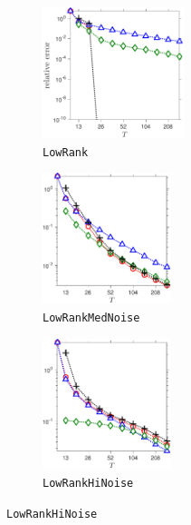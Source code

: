 \documentclass[final]{siamart1116}
\numberwithin{equation}{section}
\numberwithin{theorem}{section}
\numberwithin{figure}{section}
\begin{document}
\begin{figure}[htp!]
\begin{center}
\begin{subfigure}{.325\textwidth}
\begin{center}
\includegraphics[height=1.5in]{figures/LR_Frobenius.pdf}
\caption{\texttt{LowRank}}
\label{fig:LR-algs}
\end{center}
\end{subfigure}
\begin{subfigure}{.325\textwidth}
\begin{center}
\includegraphics[height=1.5in]{figures/MED_Frobenius.pdf}
\caption{\texttt{LowRankMedNoise}}
\label{fig:MED-algs}
\end{center}
\end{subfigure}
\begin{subfigure}{.325\textwidth}
\begin{center}
\includegraphics[height=1.5in]{figures/HI_Frobenius.pdf}
\caption{\texttt{LowRankHiNoise}}
\label{fig:HI-algs}
\end{center}
\end{subfigure}
\end{center}

\vspace{.5em}


\end{figure}
\end{document}
